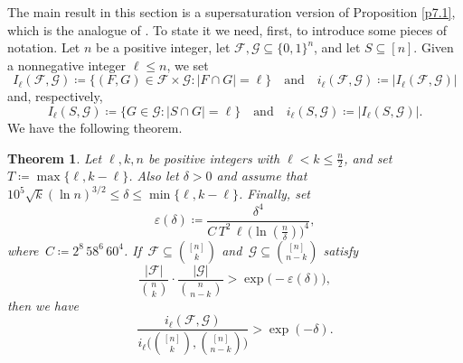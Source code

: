 \documentclass[10pt,a4paper]{amsart}
\newtheorem{thm}{Theorem}[section]
\theoremstyle{remark}
\newcommand{\ee}{\varepsilon}
\newcommand{\mik}{\leqslant}
\newcommand{\Fcal}{\mathcal{F}}
\newcommand{\Gcal}{\mathcal{G}}
\begin{document}
The main result in this section is a supersaturation version of Proposition \ref{p7.1},
which is the analogue of \cite[Theorem 1.14]{FR87}. To state it we need, first,
to introduce some pieces of notation. Let $n$ be a positive integer, let
$\Fcal,\Gcal\subseteq \{0,1\}^n$, and let $S\subseteq [n]$.
Given a nonnegative integer $\ell\mik n$, we set
\begin{equation} \label{e9.1}
I_\ell(\Fcal,\Gcal)\coloneqq \big\{(F,G)\in\Fcal\times\Gcal: |F\cap G|=\ell\big\}
\ \ \ \text{ and } \ \ \ i_\ell(\Fcal,\Gcal)\coloneqq |I_\ell(\Fcal,\Gcal)|
\end{equation}
and, respectively,
\begin{equation} \label{e9.2}
I_\ell(S,\Gcal)\coloneqq \big\{G\in\Gcal: |S\cap G|=\ell\big\}
\ \ \ \text{ and } \ \ \ i_\ell(S,\Gcal)\coloneqq |I_\ell(S,\Gcal)|.
\end{equation}
We have the following theorem.

\begin{thm} \label{t9.1}
Let $\ell,k,n$ be positive integers with $\ell< k\mik \frac{n}{2}$, and set $T\coloneqq \max\{\ell,k-\ell\}$.
Also let $\delta>0$ and assume that $10^5 \sqrt{k} (\ln n)^{3/2}\mik \delta \mik \min\{\ell,k-\ell\}$. Finally, set
\begin{equation} \label{e9.3}
\ee(\delta)\coloneqq \frac{\delta^4}{C\, T^2\, \ell\,\big(\ln(\frac{n}{\delta})\big)^4},
\end{equation}
where\, $C\coloneqq 2^{8}\, 58^6\, 60^4$. If\, $\Fcal\subseteq\binom{[n]}{k}$ and\,
$\Gcal\subseteq \binom{[n]}{n-k}$ satisfy
\begin{equation} \label{e9.4}
\frac{|\Fcal|}{\binom{n}{k}}\cdot\frac{|\Gcal|}{\binom{n}{n-k}}>\exp\big(-\ee(\delta)\big),
\end{equation}
then we have
\begin{equation} \label{e9.5}
\frac{i_{\ell}(\Fcal,\Gcal)}{i_{\ell}\big(\binom{[n]}{k},\binom{[n]}{n-k}\big)}> \exp\left(-\delta\right).
\end{equation}
\end{thm}
\end{document}

